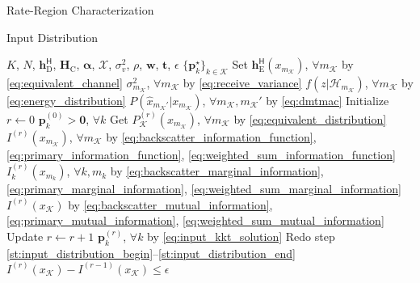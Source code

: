 \documentclass[journal,12pt,onecolumn,draftclsnofoot]{IEEEtran}
\makeatletter
\theoremstyle{remark}
\newcommand\setalgorithmcaptionfont[1]{%
	\let\my@floatc@ruled\floatc@ruled          %
	\def\floatc@ruled{%
		\global\let\floatc@ruled\my@floatc@ruled %
		#1\floatc@ruled}}
\makeatother
\begin{document}
\begin{section}{Rate-Region Characterization}
\begin{subsection}{Input Distribution}
		\setalgorithmcaptionfont{\small}
		\begin{algorithm}[!t]
			\small
			\caption{Numerical \gls{kkt} Input Distribution Evaluation by Limits of Sequence}
			\label{al:input_distribution}
			\begin{algorithmic}[1]
				\Require $K$, $N$, $\boldsymbol{h}_{\text{D}}^\mathsf{H}$, $\boldsymbol{H}_{\text{C}}$, $\boldsymbol{\alpha}$, $\mathcal{X}$, $\sigma_v^2$, $\rho$, $\boldsymbol{w}$, $\boldsymbol{t}$, $\epsilon$
				\Ensure $\{\boldsymbol{p}_k^\star\}_{k \in \mathcal{K}}$
				\State Set $\boldsymbol{h}_{\text{E}}^\mathsf{H}(x_{m_{\mathcal{K}}})$, $\forall m_{\mathcal{K}}$ by \eqref{eq:equivalent_channel}
				\State \phantom{Set} $\sigma^2_{m_{\mathcal{K}}}$, $\forall m_{\mathcal{K}}$ by \eqref{eq:receive_variance}
				\State \phantom{Set} $f(z|\mathcal{H}_{m_{\mathcal{K}}})$, $\forall m_{\mathcal{K}}$ by \eqref{eq:energy_distribution}
				\State \phantom{Set} $P(\hat{x}_{m_{\mathcal{K}}'}|x_{m_{\mathcal{K}}})$, $\forall m_{\mathcal{K}}, m_{\mathcal{K}}'$ by \eqref{eq:dmtmac}
				\State Initialize $r \gets 0$
				\State \phantom{Initialize} $\boldsymbol{p}_k^{(0)} > \boldsymbol{0}$, $\forall k$
				\State Get $P_{\mathcal{K}}^{(r)}(x_{m_{\mathcal{K}}})$, $\forall m_{\mathcal{K}}$ by \eqref{eq:equivalent_distribution} \label{st:input_distribution_begin}
				\State \phantom{Get} $I^{(r)}(x_{m_{\mathcal{K}}})$, $\forall m_{\mathcal{K}}$ by \eqref{eq:backscatter_information_function}, \eqref{eq:primary_information_function}, \eqref{eq:weighted_sum_information_function}
				\State \phantom{Get} $I^{(r)}_k(x_{m_k})$, $\forall k,m_k$ by \eqref{eq:backscatter_marginal_information}, \eqref{eq:primary_marginal_information}, \eqref{eq:weighted_sum_marginal_information}
				\State \phantom{Get} $I^{(r)}(x_{\mathcal{K}})$ by \eqref{eq:backscatter_mutual_information}, \eqref{eq:primary_mutual_information}, \eqref{eq:weighted_sum_mutual_information} \label{st:input_distribution_end}
				\Repeat
					\State Update $r \gets r+1$
					\State \phantom{Update} $\boldsymbol{p}_k^{(r)}$, $\forall k$ by \eqref{eq:input_kkt_solution}
					\State Redo step \ref{st:input_distribution_begin}--\ref{st:input_distribution_end}
				\Until $I^{(r)}(x_{\mathcal{K}}) - I^{(r-1)}(x_{\mathcal{K}}) \le \epsilon$
			\end{algorithmic}
		\end{algorithm}
	\end{subsection}


\end{section}
\end{document}
